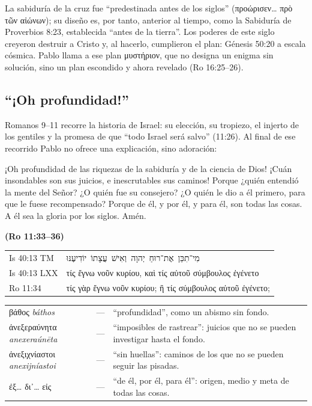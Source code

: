 \documentclass[11pt,letterpaper]{article}
\newcommand{\heb}[1]{\mbox{\foreignlanguage{hebrew}{#1}}}
\newcommand{\grc}[1]{\foreignlanguage{ancientgreek}{#1}}
\newcommand{\fuente}[1]{\par\hfill{\upshape\bfseries\small\textcolor{azul}{#1}}}
\begin{document}
La sabiduría de la cruz fue ``predestinada antes de los siglos'' (\grc{προώρισεν\ldots{} πρὸ τῶν αἰώνων}); su diseño es, por tanto, anterior al tiempo, como la Sabiduría de Proverbios 8:23, establecida ``antes de la tierra''. Los poderes de este siglo creyeron destruir a Cristo y, al hacerlo, cumplieron el plan: Génesis 50:20 a escala cósmica. Pablo llama a ese plan \grc{μυστήριον}, que no designa un enigma sin solución, sino un plan escondido y ahora revelado (Ro 16:25--26).

\subsection{``¡Oh profundidad!''}

Romanos 9--11 recorre la historia de Israel: su elección, su tropiezo, el injerto de los gentiles y la promesa de que ``todo Israel será salvo'' (11:26). Al final de ese recorrido Pablo no ofrece una explicación, sino adoración:

\begin{cita}¡Oh profundidad de las riquezas de la sabiduría y de la ciencia de Dios! ¡Cuán insondables son sus juicios, e inescrutables sus caminos! Porque ¿quién entendió la mente del Señor? ¿O quién fue su consejero? ¿O quién le dio a él primero, para que le fuese recompensado? Porque de él, y por él, y para él, son todas las cosas. A él sea la gloria por los siglos. Amén.\fuente{(Ro 11:33--36)}\end{cita}

\begin{center}\small\renewcommand{\arraystretch}{1.3}
\begin{tabular}{@{}L{2.0cm}L{12.4cm}@{}}
\toprule
Is 40:13 TM & \heb{מִי־תִכֵּן אֶת־רוּחַ יְהוָה וְאִישׁ עֲצָתוֹ יוֹדִיעֶנּוּ} \\
Is 40:13 LXX & \grc{τίς ἔγνω νοῦν κυρίου, καὶ τίς αὐτοῦ σύμβουλος ἐγένετο} \\
Ro 11:34 & \grc{τίς γὰρ ἔγνω νοῦν κυρίου; ἢ τίς σύμβουλος αὐτοῦ ἐγένετο;} \\
\bottomrule
\end{tabular}\end{center}

\begin{filologia}[Ro 11:33--36]
\begin{tabular}{@{}L{3.2cm}L{1.6cm}L{10cm}@{}}
\grc{βάθος} \emph{báthos} & --- & ``profundidad'', como un abismo sin fondo. \\[2pt]
\grc{ἀνεξεραύνητα} \emph{anexeraúnēta} & --- & ``imposibles de rastrear'': juicios que no se pueden investigar hasta el fondo. \\[2pt]
\grc{ἀνεξιχνίαστοι} \emph{anexijníastoi} & --- & ``sin huellas'': caminos de los que no se pueden seguir las pisadas. \\[2pt]
\grc{ἐξ\ldots{} δι᾽\ldots{} εἰς} & --- & ``de él, por él, para él'': origen, medio y meta de todas las cosas. \\
\end{tabular}
\end{filologia}
\end{document}
